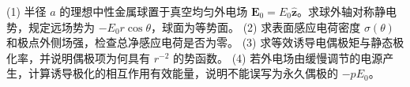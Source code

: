 (1) 半径 \(a\) 的理想中性金属球置于真空均匀外电场 \(\mathbf E_0=E_0\hat{\mathbf z}\)。求球外轴对称静电势，规定远场势为 \(-E_0r\cos\theta\)，球面为等势面。
(2) 求表面感应电荷密度 \(\sigma(\theta)\) 和极点外侧场强，检查总净感应电荷是否为零。
(3) 求等效诱导电偶极矩与静态极化率，并说明偶极项为何具有 \(r^{-2}\) 的势函数。
(4) 若外电场由缓慢调节的电源产生，计算诱导极化的相互作用有效能量，说明不能误写为永久偶极的 \(-pE_0\)。
